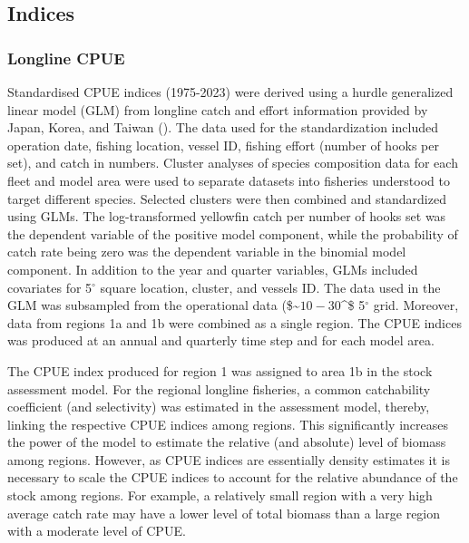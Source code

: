 \documentclass[
]{scrartcl}
\begin{document}
\subsection{Indices}\label{indices}

\subsubsection{Longline CPUE}\label{longline-cpue}

Standardised CPUE indices (1975-2023) were derived using a hurdle
generalized linear model (GLM) from longline catch and effort
information provided by Japan, Korea, and Taiwan
().
The data used for the standardization included operation date, fishing
location, vessel ID, fishing effort (number of hooks per set), and catch
in numbers. Cluster analyses of species composition data for each fleet
and model area were used to separate datasets into fisheries understood
to target different species. Selected clusters were then combined and
standardized using GLMs. The log-transformed yellowfin catch per number
of hooks set was the dependent variable of the positive model component,
while the probability of catch rate being zero was the dependent
variable in the binomial model component. In addition to the year and
quarter variables, GLMs included covariates for 5\(^\circ\) square
location, cluster, and vessels ID. The data used in the GLM was
subsampled from the operational data (\$\sim\(10-30%
\)\^{}\circ \times\$ 5\(^\circ\) grid. Moreover, data from regions 1a
and 1b were combined as a single region. The CPUE indices was produced
at an annual and quarterly time step and for each model area.

The CPUE index produced for region 1 was assigned to area 1b in the
stock assessment model. For the regional longline fisheries, a common
catchability coefficient (and selectivity) was estimated in the
assessment model, thereby, linking the respective CPUE indices among
regions. This significantly increases the power of the model to estimate
the relative (and absolute) level of biomass among regions. However, as
CPUE indices are essentially density estimates it is necessary to scale
the CPUE indices to account for the relative abundance of the stock
among regions. For example, a relatively small region with a very high
average catch rate may have a lower level of total biomass than a large
region with a moderate level of CPUE.
\end{document}

